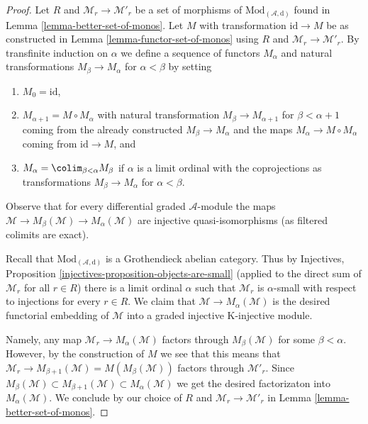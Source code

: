 \begin{proof}
Let $R$ and $\mathcal{M}_r \to \mathcal{M}'_r$ be a set of
morphisms of $\text{Mod}_{(\mathcal{A}, \text{d})}$ found in
Lemma \ref{lemma-better-set-of-monos}.
Let $M$ with transformation $\text{id} \to M$
be as constructed in Lemma \ref{lemma-functor-set-of-monos}
using $R$ and $\mathcal{M}_r \to \mathcal{M}'_r$.
By transfinite induction on $\alpha$ we define a sequence of functors
$M_\alpha$ and natural transformations $M_\beta \to M_\alpha$
for $\alpha < \beta$ by setting
\begin{enumerate}
\item $M_0 = \text{id}$,
\item $M_{\alpha + 1} = M \circ M_\alpha$ with natural transformation
$M_\beta \to M_{\alpha + 1}$ for $\beta < \alpha + 1$
coming from the already constructed $M_\beta \to M_\alpha$ and the
maps $M_\alpha \to M \circ M_\alpha$ coming from $\text{id} \to M$, and
\item $M_\alpha = \colim_{\beta < \alpha} M_\beta$ if $\alpha$
is a limit ordinal with the coprojections as transformations
$M_\beta \to M_\alpha$ for $\alpha < \beta$.
\end{enumerate}
Observe that for every differential graded $\mathcal{A}$-module the maps
$\mathcal{M} \to M_\beta(\mathcal{M}) \to M_\alpha(\mathcal{M})$
are injective quasi-isomorphisms (as filtered colimits are exact).

\medskip\noindent
Recall that $\text{Mod}_{(\mathcal{A}, \text{d})}$ is a Grothendieck
abelian category. Thus by
Injectives, Proposition \ref{injectives-proposition-objects-are-small}
(applied to the direct sum of $\mathcal{M}_r$ for all $r \in R$)
there is a limit ordinal $\alpha$ such that $\mathcal{M}_r$ is $\alpha$-small
with respect to injections for every $r \in R$.
We claim that $\mathcal{M} \to M_\alpha(\mathcal{M})$ is
the desired functorial embedding of $\mathcal{M}$ into a
graded injective K-injective module.

\medskip\noindent
Namely, any map $\mathcal{M}_r \to M_\alpha(\mathcal{M})$
factors through $M_\beta(\mathcal{M})$ for some $\beta < \alpha$.
However, by the construction of $M$ we see that this means
that $\mathcal{M}_r \to M_{\beta + 1}(\mathcal{M}) = M(M_\beta(\mathcal{M}))$
factors through $\mathcal{M}'_r$. Since
$M_\beta(\mathcal{M}) \subset  M_{\beta + 1}(\mathcal{M})
\subset M_\alpha(\mathcal{M})$ we get the desired factorizaton
into $M_\alpha(\mathcal{M})$. We conclude by our choice of
$R$ and $\mathcal{M}_r \to \mathcal{M}'_r$ in
Lemma \ref{lemma-better-set-of-monos}.
\end{proof}










